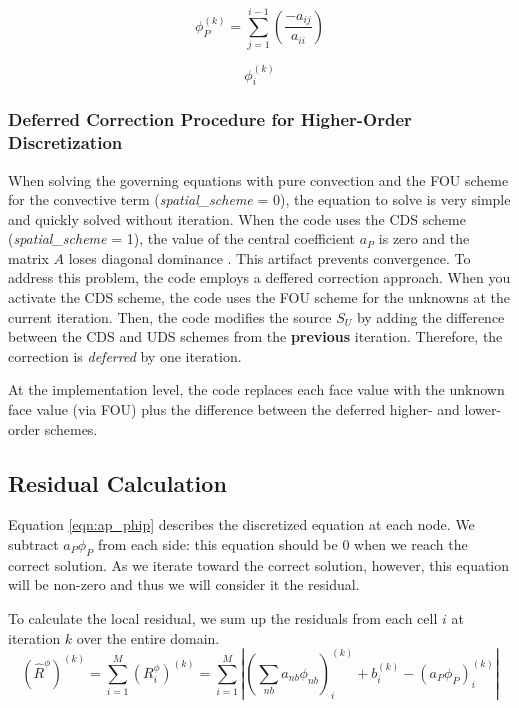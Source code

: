 \documentclass{article}
\newcommand{\lp}{\left(}
\newcommand{\rp}{\right)}
\begin{document}
\begin{equation}
    \phi_P^{\lp k \rp} = \sum_{j=1}^{i-1} \lp \frac{-a_{ij}}{a_{ii}} \rp
\end{equation}



\begin{equation}
    \phi_i^{\lp k \rp}
\end{equation}

\subsubsection{Deferred Correction Procedure for Higher-Order Discretization}
When solving the governing equations with pure convection and the FOU scheme for the convective term (\textit{spatial\_scheme} = 0), the equation to solve is very simple and quickly solved without iteration. When the code uses the CDS scheme (\textit{spatial\_scheme} = 1), the value of the central coefficient $a_P$ is zero and the matrix $A$ loses diagonal dominance \cite{fer_per}. 
This artifact prevents convergence.
To address this problem, the code employs a deffered correction approach.
When you activate the CDS scheme, the code uses the FOU scheme for the unknowns at the current iteration. 
Then, the code modifies the source $S_U$ by adding the difference between the CDS and UDS schemes from the \textbf{previous} iteration.
Therefore, the correction is \textit{deferred} by one iteration.

At the implementation level, the code replaces each face value with the unknown face value (via FOU) plus the difference between the deferred higher- and lower-order schemes. 

\subsection{Residual Calculation}

Equation \ref{eqn:ap_phip} describes the discretized equation at each node. We subtract $a_P\phi_P$ from each side: this equation should be 0 when we reach the correct solution. As we iterate toward the correct solution, however, this equation will be non-zero and thus we will consider it the residual. 

To calculate the local residual, we sum up the residuals from each cell $i$ at iteration $k$ over the entire domain.
\begin{equation}
    \lp \hat{R}^{\phi} \rp^{\lp k\rp} = \sum_{i=1}^M \lp R_i^{\phi}\rp^{\lp k \rp} = \sum_{i=1}^M \left|\lp \sum_{nb}a_{nb}\phi_{nb} \rp_i^{\lp k \rp} + b_i^{\lp k \rp} - \lp a_P\phi_P \rp_i^{\lp k \rp} \right|
    \label{eqn:resid_local}
\end{equation}
\end{document}
